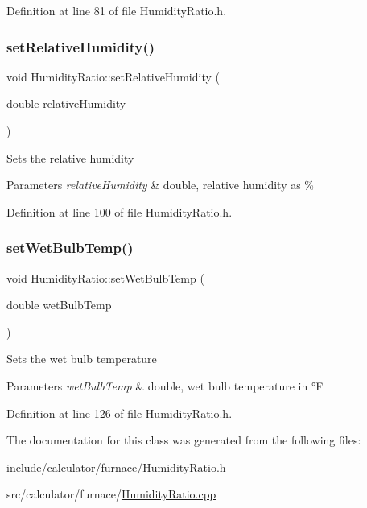 Definition at line 81 of file Humidity\+Ratio.\+h.

\mbox{\label{class_humidity_ratio_a110aecb6587a836ab76d4aca840e5759}} 
\subsubsection{\texorpdfstring{set\+Relative\+Humidity()}{setRelativeHumidity()}}
{\footnotesize\ttfamily void Humidity\+Ratio\+::set\+Relative\+Humidity (\begin{DoxyParamCaption}\item[{double}]{relative\+Humidity }\end{DoxyParamCaption})\hspace{0.3cm}{\ttfamily [inline]}}

Sets the relative humidity


\begin{DoxyParams}{Parameters}
{\em relative\+Humidity} & double, relative humidity as \% \\
\hline
\end{DoxyParams}


Definition at line 100 of file Humidity\+Ratio.\+h.

\mbox{\label{class_humidity_ratio_a5bda925f783cb4cef848245b00e28e29}} 
\subsubsection{\texorpdfstring{set\+Wet\+Bulb\+Temp()}{setWetBulbTemp()}}
{\footnotesize\ttfamily void Humidity\+Ratio\+::set\+Wet\+Bulb\+Temp (\begin{DoxyParamCaption}\item[{double}]{wet\+Bulb\+Temp }\end{DoxyParamCaption})\hspace{0.3cm}{\ttfamily [inline]}}

Sets the wet bulb temperature


\begin{DoxyParams}{Parameters}
{\em wet\+Bulb\+Temp} & double, wet bulb temperature in °F \\
\hline
\end{DoxyParams}


Definition at line 126 of file Humidity\+Ratio.\+h.



The documentation for this class was generated from the following files\+:\begin{DoxyCompactItemize}
\item 
include/calculator/furnace/\hyperlink{_humidity_ratio_8h}{Humidity\+Ratio.\+h}\item 
src/calculator/furnace/\hyperlink{_humidity_ratio_8cpp}{Humidity\+Ratio.\+cpp}\end{DoxyCompactItemize}
